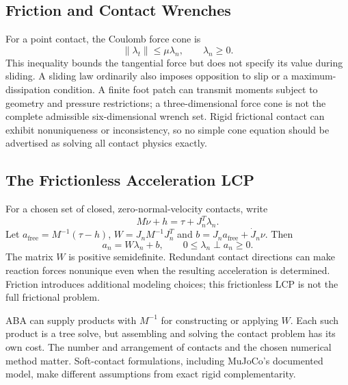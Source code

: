 \subsection{Friction and Contact Wrenches}
\label{subsec:friction_cone}

For a point contact, the Coulomb force cone is
\begin{equation}
 \|\lambda_t\|\le\mu\lambda_n,\qquad\lambda_n\ge0.
 \label{eq:coulomb_friction}
\end{equation}
This inequality bounds the tangential force but does not specify its value during sliding. A sliding law ordinarily also imposes opposition to slip or a maximum-dissipation condition. A finite foot patch can transmit moments subject to geometry and pressure restrictions; a three-dimensional force cone is not the complete admissible six-dimensional wrench set. Rigid frictional contact can exhibit nonuniqueness or inconsistency, so no simple cone equation should be advertised as solving all contact physics exactly.

\subsection{The Frictionless Acceleration LCP}
\label{subsec:lcp_formulation}

For a chosen set of closed, zero-normal-velocity contacts, write
\begin{equation}
 M\dot\nu+h=\tau+J_n^T\lambda_n.
 \label{eq:constrained_dynamics}
\end{equation}
Let $a_{\mathrm{free}}=M^{-1}(\tau-h)$, $W=J_nM^{-1}J_n^T$ and $b=J_n a_{\mathrm{free}}+\dot J_n\nu$. Then
\begin{equation}
 a_n=W\lambda_n+b,\qquad
 0\le\lambda_n\perp a_n\ge0.
 \label{eq:lcp}
\end{equation}
The matrix $W$ is positive semidefinite. Redundant contact directions can make reaction forces nonunique even when the resulting acceleration is determined. Friction introduces additional modeling choices; this frictionless LCP is not the full frictional problem.

ABA can supply products with $M^{-1}$ for constructing or applying $W$. Each such product is a tree solve, but assembling and solving the contact problem has its own cost. The number and arrangement of contacts and the chosen numerical method matter. Soft-contact formulations, including MuJoCo's documented model, make different assumptions from exact rigid complementarity.

